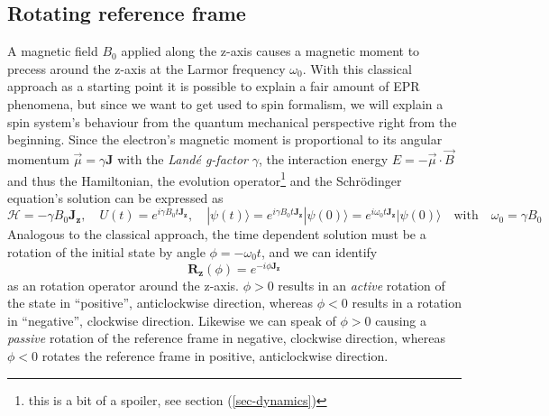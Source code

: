 \documentclass[11.5pt,a4paper]{article}
\begin{document}
\subsection{Rotating reference frame}
A magnetic field $B_0$ applied along the z-axis causes a magnetic moment to precess around the z-axis at the Larmor frequency $\omega_0$. With this classical approach as a starting point it is possible to explain a fair amount of EPR phenomena, but since we want to get used to spin formalism, we will explain a spin system's behaviour from the quantum mechanical perspective right from the beginning. Since the electron's magnetic moment is proportional to its angular momentum $\vec{\mu} = \gamma \mathbf{J}$ with the \emph{Land\'e g-factor} $\gamma$, the interaction energy $E = - \vec{\mu} \cdot \vec{B}$ and thus the Hamiltonian, the evolution operator\footnote{this is a bit of a spoiler, see section (\ref{sec-dynamics})} and the Schr\"odinger equation's solution can be expressed as
\begin{equation}
  \mathcal{H} = - \gamma B_0 \mathbf{J_z}, \quad U(t) = e^{i \gamma B_0 t \mathbf{J_z}}, \quad |\psi(t)\rangle = e^{i \gamma B_0 t \mathbf{J_z}} |\psi(0)\rangle = e^{i \omega_0 t \mathbf{J_z}} |\psi(0)\rangle \quad \text{with} \quad \omega_0 = \gamma B_0
\end{equation}
Analogous to the classical approach, the time dependent solution must be a rotation of the initial state by angle $\phi = -\omega_0 t$, and we can identify 
\begin{equation}
 \mathbf{R_z}(\phi) = e^{-i\phi \mathbf{J_z}}
\label{eq-z-rotation}
\end{equation}
as an rotation operator around the z-axis. $\phi > 0$ results in an \emph{active} rotation of the state in ``positive'', anticlockwise direction, whereas $\phi < 0$ results in  a rotation in ``negative'', clockwise direction. Likewise we can speak of $\phi > 0$ causing a \emph{passive} rotation of the reference frame in negative, clockwise direction, whereas $\phi < 0$ rotates the reference frame in positive, anticlockwise direction.
\end{document}
